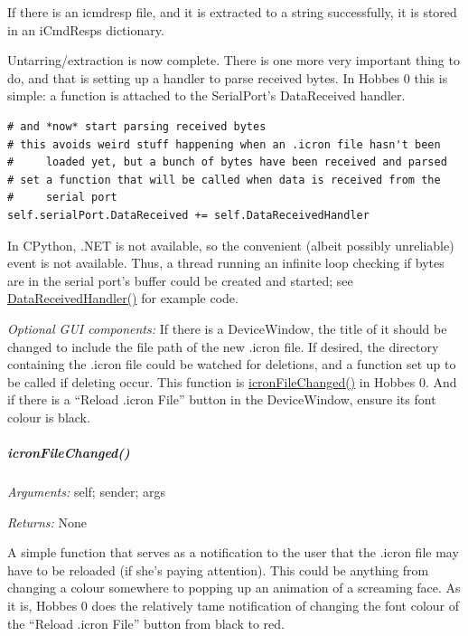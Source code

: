 \documentclass[12pt,letterpaper]{article}
\begin{document}
If there is an icmdresp file, and it is extracted to a string successfully, it is stored in an iCmdResps dictionary.

Untarring/extraction is now complete. There is one more very important thing to do, and that is setting up a handler to parse received bytes. In Hobbes 0 this is simple: a function is attached to the SerialPort's DataReceived handler.

\selectfont

\begin{lstlisting}
# and *now* start parsing received bytes
# this avoids weird stuff happening when an .icron file hasn't been
#     loaded yet, but a bunch of bytes have been received and parsed
# set a function that will be called when data is received from the
#     serial port
self.serialPort.DataReceived += self.DataReceivedHandler
\end{lstlisting}

\selectfont

In CPython, .NET is not available, so the convenient (albeit possibly unreliable) event is not available. Thus, a thread running an infinite loop checking if bytes are in the serial port's buffer could be created and started; see \hyperref[4.3.1.2.2]{DataReceivedHandler()} for example code.

\emph{Optional GUI components:} If there is a DeviceWindow, the title of it should be changed to include the file path of the new .icron file. If desired, the directory containing the .icron file could be watched for deletions, and a function set up to be called if deleting occur. This function is \hyperref[4.3.1.2.6]{icronFileChanged()} in Hobbes 0. And if there is a ``Reload .icron File'' button in the DeviceWindow, ensure its font colour is black.



%
%
\subparagraph{icronFileChanged()}
\label{4.3.1.2.6}

\emph{Arguments:} self; sender; args

\emph{Returns:} None

A simple function that serves as a notification to the user that the .icron file may have to be reloaded (if she's paying attention). This could be anything from changing a colour somewhere to popping up an animation of a screaming face. As it is, Hobbes 0 does the relatively tame notification of changing the font colour of the ``Reload .icron File'' button from black to red.
\end{document}
